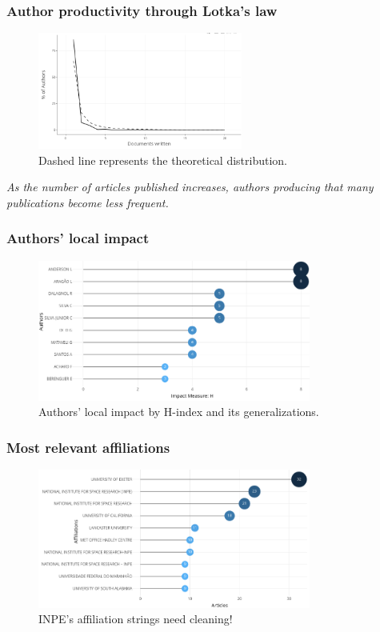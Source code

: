 \documentclass[aspectratio=169]{beamer}
\begin{document}
\begin{frame}
  \frametitle{Author productivity through Lotka's law}
  \begin{figure}
    \centering
    \includegraphics[width=0.6\textwidth]
    {img/loktas_law.png}
    \caption{Dashed line represents the theoretical distribution.}
    \label{fig:loktas_law}
  \end{figure}
  \emph{As the number of articles published increases, authors producing that
  many publications become less frequent.}
\end{frame}

\begin{frame}
  \frametitle{Authors' local impact}
  \begin{figure}
    \centering
    \includegraphics[width=0.8\textwidth]
    {img/authors_local_impact.png}
    \caption{Authors' local impact by H-index and its generalizations.}
    \label{fig:authors_local_impact}
  \end{figure}
\end{frame}

\begin{frame}
  \frametitle{Most relevant affiliations}
  \begin{figure}
    \centering
    \includegraphics[width=0.8\textwidth]
    {img/most_relevant_affiliations.png}
    \caption{INPE's affiliation strings need cleaning!}
    \label{fig:most_relevant_affiliations}
  \end{figure}
\end{frame}
\end{document}
